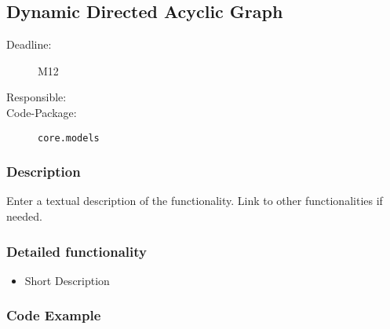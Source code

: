 \newpage
\subsection{Dynamic Directed Acyclic Graph}
\label{Functionality:ID}

\begin{description}
\item[Deadline:] M12
\item[Responsible:]
\item[Code-Package:] \texttt{core.models}
\end{description}


\subsubsection*{Description}

Enter a textual description of the functionality. Link to other functionalities if needed. 

\subsubsection*{Detailed functionality}

\begin{itemize}
\item Short Description
\end{itemize}

\subsubsection*{Code Example}



